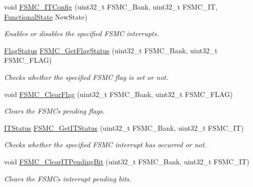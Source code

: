 \begin{DoxyCompactItemize}
void \hyperlink{group___f_s_m_c___exported___functions_ga217027ae3cd213b9076b6a1be197064c}{F\+S\+M\+C\+\_\+\+I\+T\+Config} (uint32\+\_\+t F\+S\+M\+C\+\_\+\+Bank, uint32\+\_\+t F\+S\+M\+C\+\_\+\+IT, \hyperlink{group___exported__types_gac9a7e9a35d2513ec15c3b537aaa4fba1}{Functional\+State} New\+State)
\begin{DoxyCompactList}\small\item\em Enables or disables the specified F\+S\+MC interrupts. \end{DoxyCompactList}\item 
\hyperlink{group___exported__types_ga89136caac2e14c55151f527ac02daaff}{Flag\+Status} \hyperlink{group___f_s_m_c___exported___functions_gae00355115b078f483f0771057bb849c4}{F\+S\+M\+C\+\_\+\+Get\+Flag\+Status} (uint32\+\_\+t F\+S\+M\+C\+\_\+\+Bank, uint32\+\_\+t F\+S\+M\+C\+\_\+\+F\+L\+AG)
\begin{DoxyCompactList}\small\item\em Checks whether the specified F\+S\+MC flag is set or not. \end{DoxyCompactList}\item 
void \hyperlink{group___f_s_m_c___exported___functions_ga697618f2de0ad9a8a82461ddbebd5264}{F\+S\+M\+C\+\_\+\+Clear\+Flag} (uint32\+\_\+t F\+S\+M\+C\+\_\+\+Bank, uint32\+\_\+t F\+S\+M\+C\+\_\+\+F\+L\+AG)
\begin{DoxyCompactList}\small\item\em Clears the F\+S\+MC\textquotesingle{}s pending flags. \end{DoxyCompactList}\item 
\hyperlink{group___exported__types_gaacbd7ed539db0aacd973a0f6eca34074}{I\+T\+Status} \hyperlink{group___f_s_m_c___exported___functions_ga7fce9ca889d33cd8b8b7413875dd4d73}{F\+S\+M\+C\+\_\+\+Get\+I\+T\+Status} (uint32\+\_\+t F\+S\+M\+C\+\_\+\+Bank, uint32\+\_\+t F\+S\+M\+C\+\_\+\+IT)
\begin{DoxyCompactList}\small\item\em Checks whether the specified F\+S\+MC interrupt has occurred or not. \end{DoxyCompactList}\item 
void \hyperlink{group___f_s_m_c___exported___functions_gad9387e7674b8a376256a3378649e004e}{F\+S\+M\+C\+\_\+\+Clear\+I\+T\+Pending\+Bit} (uint32\+\_\+t F\+S\+M\+C\+\_\+\+Bank, uint32\+\_\+t F\+S\+M\+C\+\_\+\+IT)
\begin{DoxyCompactList}\small\item\em Clears the F\+S\+MC\textquotesingle{}s interrupt pending bits. \end{DoxyCompactList}\end{DoxyCompactItemize}


